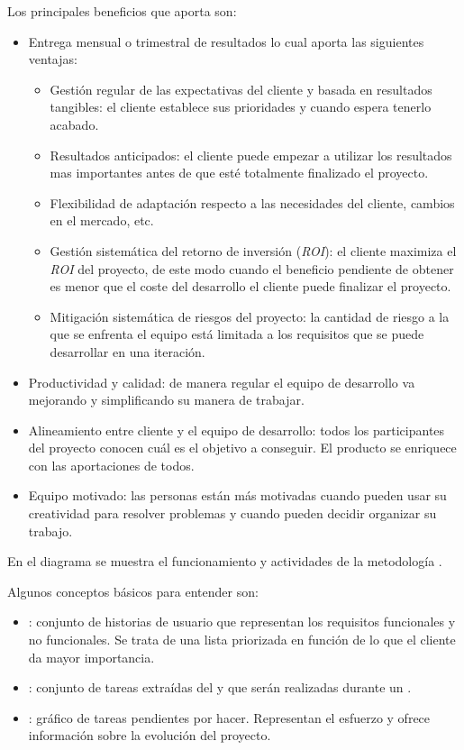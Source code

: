 Los principales beneficios que aporta \scrum{} son:
\begin{itemize}
 \item Entrega mensual o trimestral de resultados lo cual aporta las siguientes ventajas:
  \begin{itemize}
   \item Gestión regular de las expectativas del cliente y basada en resultados tangibles: el cliente establece sus prioridades y cuando espera tenerlo acabado.
   \item Resultados anticipados: el cliente puede empezar a utilizar los resultados mas importantes antes de que esté totalmente finalizado el proyecto.
   \item Flexibilidad de adaptación respecto a las necesidades del cliente, cambios en el mercado, etc.
   \item Gestión sistemática del retorno de inversión (\textit{ROI}): el cliente maximiza el \textit{ROI} del proyecto, de este modo cuando el beneficio pendiente de obtener es menor que el coste del desarrollo el cliente puede finalizar el proyecto.
   \item Mitigación sistemática de riesgos del proyecto: la cantidad de riesgo a la que se enfrenta el equipo está limitada a los requisitos que se puede desarrollar en una iteración.
  \end{itemize}
 \item Productividad y calidad: de manera regular el equipo de desarrollo va mejorando y simplificando su manera de trabajar.
 \item Alineamiento entre cliente y el equipo de desarrollo: todos los participantes del proyecto conocen cuál es el objetivo a conseguir. El producto se enriquece con las aportaciones de todos.
 \item Equipo motivado: las personas están más motivadas cuando pueden usar su creatividad para resolver problemas y cuando pueden decidir organizar su trabajo.
\end{itemize}

En el diagrama  se muestra el funcionamiento y actividades de la metodología \scrum{}.


Algunos conceptos básicos para entender \scrum{} son:
\begin{itemize}
 \item \productbacklog{}: conjunto de historias de usuario que representan los requisitos funcionales y no funcionales. Se trata de una lista priorizada en función de lo que el cliente da mayor importancia.
 \item \sprintbacklog{}: conjunto de tareas extraídas del \productbacklog{} y que serán realizadas durante un \sprint{}.
 \item \burndownchart{}: gráfico de tareas pendientes por hacer. Representan el esfuerzo y ofrece información sobre la evolución del proyecto.
\end{itemize}


